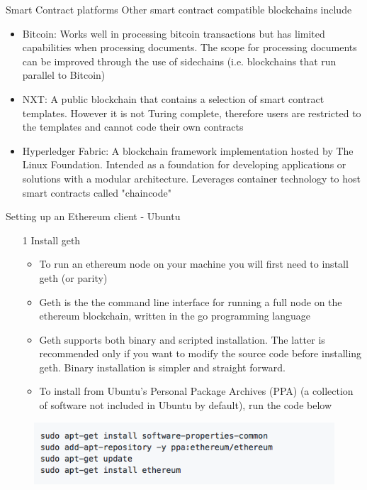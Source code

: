 \documentclass[11pt]{beamer}
\begin{document}

\begin{frame}{Smart Contract platforms}
	Other smart contract compatible blockchains include
	\begin{itemize}
		\item Bitcoin: Works well in processing bitcoin transactions but has limited capabilities when processing documents. The scope for processing documents can be improved through the use of sidechains (i.e. blockchains that run parallel to Bitcoin)
		\item NXT: A public blockchain that contains a selection of smart contract templates. However it is not Turing complete, therefore users are restricted to the templates and cannot code their own contracts
		\item Hyperledger Fabric: A blockchain framework implementation hosted by The Linux Foundation. Intended as a foundation for developing applications or solutions with a modular architecture. Leverages container technology to host smart contracts called "chaincode"
	\end{itemize}
\end{frame}


\begin{frame}{Setting up an Ethereum client - Ubuntu}
	\begin{enumerate}
		\item [1] Install geth
		\begin{itemize}
			\item To run an ethereum node on your machine you will first need to install geth (or parity)
			\item Geth is the the command line interface for running a full node on the ethereum blockchain, written in the go programming language
			\item Geth supports both binary and scripted installation. The latter is recommended only if you want to modify the source code before installing geth. Binary installation is simpler and straight forward.
			\item To install from Ubuntu's Personal Package Archives (PPA) (a collection of software not included in Ubuntu by default), run the code below
		\end{itemize}
	\end{enumerate}
	\begin{figure}[]
		\centering
		\includegraphics  [scale=0.5]{Images/geth1}
	\end{figure}
\end{frame}
\end{document}

